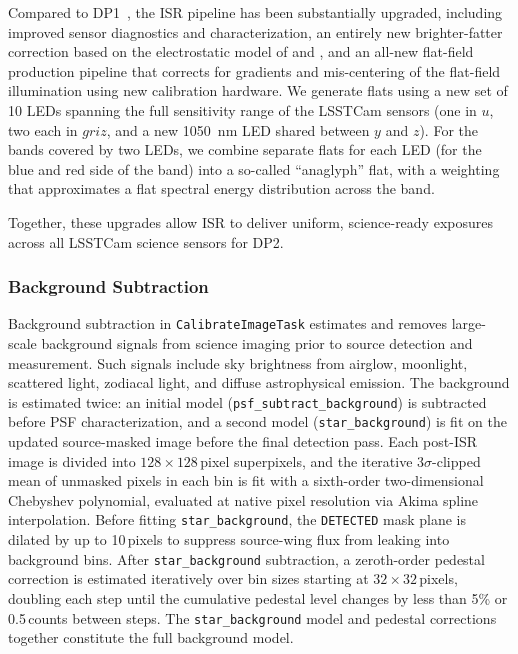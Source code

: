 Compared to DP1~\citep[][]{rtn-095}, the ISR pipeline has been substantially upgraded, including improved sensor diagnostics and characterization, an entirely new brighter-fatter correction based on the electrostatic model of \citet[][]{2023A&A...670A.118A} and \citet[][]{2024PASP..136d5003B}, and an all-new flat-field production pipeline that corrects for gradients and mis-centering of the flat-field illumination using new calibration hardware.
We generate flats using a new set of 10 LEDs spanning the full sensitivity range of the \gls{LSSTCam} sensors (one in $u$, two each in $griz$, and a new 1050~nm \gls{LED} shared between $y$ and $z$).
For the bands covered by two LEDs, we combine separate flats for each \gls{LED} (for the blue and red side of the band) into a so-called ``anaglyph'' flat, with a weighting that approximates a flat spectral energy distribution across the band.

Together, these upgrades allow \gls{ISR} to deliver uniform, science-ready exposures across all \gls{LSSTCam} science sensors for DP2.

\subsubsection{Background Subtraction} \label{sec:drp-singlevisit-background}

Background subtraction in \texttt{CalibrateImageTask} estimates and removes large-scale \gls{background} signals from science imaging prior to source detection and measurement.
Such signals include sky brightness from airglow, moonlight, scattered light, zodiacal light, and diffuse astrophysical emission.
The \gls{background} is estimated twice: an initial model (\texttt{psf\_subtract\_background}) is subtracted before \gls{PSF} characterization, and a second model (\texttt{star\_background}) is fit on the updated source-masked image before the final detection pass.
Each post-\gls{ISR} image is divided into $128 \times 128$\,pixel superpixels, and the iterative $3\sigma$-clipped mean of unmasked pixels in each bin is fit with a sixth-order two-dimensional Chebyshev polynomial, evaluated at native pixel resolution via Akima spline interpolation.
Before fitting \texttt{star\_background}, the \texttt{DETECTED} mask plane is dilated by up to 10\,pixels to suppress source-wing \gls{flux} from leaking into \gls{background} bins.
After \texttt{star\_background} subtraction, a zeroth-order pedestal correction is estimated iteratively over bin sizes starting at $32 \times 32$\,pixels, doubling each step until the cumulative pedestal level changes by less than 5\% or 0.5\,counts between steps.
The \texttt{star\_background} model and pedestal corrections together constitute the full \gls{background} model.

